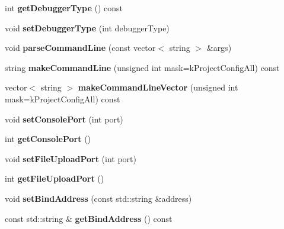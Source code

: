 \begin{DoxyCompactItemize}
int {\bfseries get\+Debugger\+Type} () const
\item 
\mbox{\label{classProjectConfig_a4d63af115eaa6775bf225e3f2d48d1ab}} 
void {\bfseries set\+Debugger\+Type} (int debugger\+Type)
\item 
\mbox{\label{classProjectConfig_ae7c768afc18587b80aafc3e0651309ef}} 
void {\bfseries parse\+Command\+Line} (const vector$<$ string $>$ \&args)
\item 
\mbox{\label{classProjectConfig_a4accfa098255c2f65a6d0adecf3f0bc1}} 
string {\bfseries make\+Command\+Line} (unsigned int mask=k\+Project\+Config\+All) const
\item 
\mbox{\label{classProjectConfig_aa1c23419524fb2543b26db6574c493a4}} 
vector$<$ string $>$ {\bfseries make\+Command\+Line\+Vector} (unsigned int mask=k\+Project\+Config\+All) const
\item 
\mbox{\label{classProjectConfig_a4e29923c8a72510b9dce9c1b1be68d60}} 
void {\bfseries set\+Console\+Port} (int port)
\item 
\mbox{\label{classProjectConfig_a4fedc38204aae13b344cf285b53c7404}} 
int {\bfseries get\+Console\+Port} ()
\item 
\mbox{\label{classProjectConfig_a93ff0f7bd719f405ec20af9413d90e0b}} 
void {\bfseries set\+File\+Upload\+Port} (int port)
\item 
\mbox{\label{classProjectConfig_ae5db6e948707ed2cab065cbb30c95639}} 
int {\bfseries get\+File\+Upload\+Port} ()
\item 
\mbox{\label{classProjectConfig_ae1ef573a921de1aeaf7d3f9e80674ae8}} 
void {\bfseries set\+Bind\+Address} (const std\+::string \&address)
\item 
\mbox{\label{classProjectConfig_a60711d760daed166f54302e2ccd08b04}} 
const std\+::string \& {\bfseries get\+Bind\+Address} () const
\item 
\mbox{\label{classProjectConfig_abf4ad24ee28afe5ed49798c05e967cdf}} 

\end{DoxyCompactItemize}
